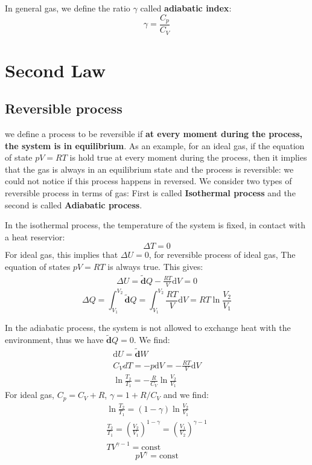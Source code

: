 \documentclass{article}
\newcommand{\dbar}{\mathbf{\tilde{d}}}
\newcommand{\dnor}{\text{d}}
\begin{document}
In general gas, we define the ratio $\gamma$ called \textbf{adiabatic index}:
\begin{equation}
    \gamma = \frac{C_p}{C_V}
\end{equation}


\section{Second Law}

\subsection{Reversible process}
we define a process to be reversible if \textbf{at every moment during the process, the system
is in equilibrium}. As an example, for an ideal gas, if the equation of state $pV = RT$ is hold true
at every moment during the process, then it implies that the gas is always in an equilibrium state
and the process is reversible: we could not notice if this process happens in reversed. 
We consider two types of reversible process in terms of gas: First is called \textbf{Isothermal process}
and the second is called \textbf{Adiabatic process}.

In the isothermal process, the temperature of the system is fixed, in contact with a heat reservior:
\begin{equation}
    \Delta T = 0
\end{equation}
For ideal gas, this implies that $\Delta U = 0$, for reversible process of ideal gas, The 
equation of states $pV = RT$ is always true. This gives:
\begin{gather}
    \Delta U = \dbar Q - \frac{RT}{V} \dnor V = 0
\end{gather}
\[
\boxed{\Delta Q = \int_{V_1}^{V_2} \dbar Q = \int_{V_1}^{V_2} \frac{RT}{V} \dnor V = RT \ln \frac{V_2}{V_1}}
\]

In the adiabatic process, the system is not allowed to exchange heat with the 
environment, thus we have $\dbar Q = 0$. We find:
\begin{gather}
    \dnor U = \dbar W \\
    C_V dT = - p \dnor V = - \frac{RT}{V} \dnor V \\
    \ln \frac{T_2}{T_1} = - \frac{R}{C_V} \ln \frac{V_2}{V_1}
\end{gather}
For ideal gas, $C_p = C_V + R$, $\gamma = 1 + R / C_V$ and we find:
\begin{gather}
    \ln \frac{T_2}{T_1} = (1-\gamma) \ln \frac{V_2}{V_1} \\
    \frac{T_2}{T_1} = \left( \frac{V_2}{V_1} \right) ^ {1-\gamma} = \left( \frac{V_1}{V_2} \right) ^ {\gamma-1} \\
    T V^{\gamma - 1} = \text{const}
\end{gather}
\[ \boxed{p V^{\gamma} = \text{const}} \]
\end{document}
